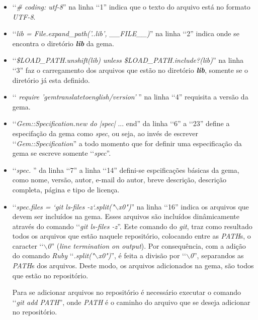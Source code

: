 \begin{itemize}

 \item ‘‘\emph{\# coding: utf-8}'' na linha ‘‘1'' indica que o texto do arquivo está no formato \emph{UTF-8}.

 \item ‘‘\emph{lib = File.expand\_path('..\/lib', \_\_FILE\_\_)}'' na linha ‘‘2'' indica onde se encontra o
 diretório \emph{\textbf{lib}} da gema.

 \item ‘‘\emph{\$LOAD\_PATH.unshift(lib) unless \$LOAD\_PATH.include?(lib)}'' na linha ‘‘3'' faz o
 carregamento dos arquivos que estão no diretório \emph{\textbf{lib}}, somente se o diretório já
 esta definido.

 \item ‘‘ \emph{require 'gemtranslatetoenglish/version'} '' na linha ‘‘4'' requisita a versão da gema.

 \item ‘‘\emph{Gem::Specification.new do |spec|} ... end'' da linha ‘‘6'' a ‘‘23'' define a especifação da
 gema como \emph{spec}, ou seja, ao invés de escrever ‘‘\emph{Gem::Specification}'' a todo momento que for
 definir uma especificação da gema se escreve somente ‘‘\emph{spec}''.

 \item ‘‘\emph{spec. }'' da linha ‘‘7'' a linha ‘‘14'' defini-se espcificações básicas da gema, como nome,
 versão, autor, e-mail do autor, breve descrição, descrição completa, página e tipo de licença.

 \item ‘‘\emph{spec.files = `git ls-files -z`.split("$\backslash$x0")}'' na linha ‘‘16'' indica os arquivos
 que devem ser incluídos na gema. Esses arquivos são incluídos dinâmicamente através do comando
 ‘‘\emph{git ls-files -z}''. Este comando do \emph{git}, traz como resultado todos os arquivos que estão
 naquele repositório, colocando entre as \emph{PATH}s, o caracter ‘‘\emph{$\backslash$0}''
 (\emph{line termination on output}). Por consequência, com a adição do comando \emph{Ruby}
 ‘‘\emph{.split("$\backslash$x0")}'', é feita a divisão por ‘‘\emph{$\backslash$0}'', separandos as
 \emph{PATH}s dos arquivos. Deste modo, os arquivos adicionados na gema, são todos que estão no repositório.

 Para se adicionar arquivos no repositório é necessário executar o comando ‘‘\emph{git add PATH}'',
 onde \emph{PATH} é o caminho do arquivo que se deseja adicionar no repositório.


\end{itemize}
